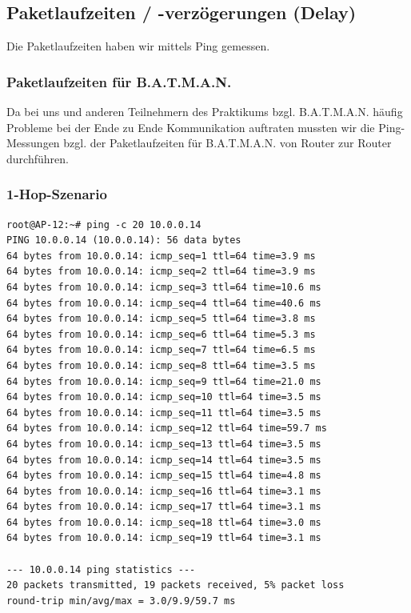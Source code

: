 \documentclass[a4paper,10pt]{article}
\begin{document}
\subsection{Paketlaufzeiten / -verzögerungen (Delay)}


Die Paketlaufzeiten haben wir mittels Ping gemessen.

\subsubsection{Paketlaufzeiten für B.A.T.M.A.N.}

Da bei uns und anderen Teilnehmern des Praktikums bzgl. B.A.T.M.A.N. häufig Probleme bei der Ende zu Ende Kommunikation auftraten mussten wir die Ping-Messungen bzgl. der Paketlaufzeiten für B.A.T.M.A.N. von Router zur Router durchführen.

\subsubsection*{1-Hop-Szenario}

\begin{lstlisting}
root@AP-12:~# ping -c 20 10.0.0.14
PING 10.0.0.14 (10.0.0.14): 56 data bytes
64 bytes from 10.0.0.14: icmp_seq=1 ttl=64 time=3.9 ms
64 bytes from 10.0.0.14: icmp_seq=2 ttl=64 time=3.9 ms
64 bytes from 10.0.0.14: icmp_seq=3 ttl=64 time=10.6 ms
64 bytes from 10.0.0.14: icmp_seq=4 ttl=64 time=40.6 ms
64 bytes from 10.0.0.14: icmp_seq=5 ttl=64 time=3.8 ms
64 bytes from 10.0.0.14: icmp_seq=6 ttl=64 time=5.3 ms
64 bytes from 10.0.0.14: icmp_seq=7 ttl=64 time=6.5 ms
64 bytes from 10.0.0.14: icmp_seq=8 ttl=64 time=3.5 ms
64 bytes from 10.0.0.14: icmp_seq=9 ttl=64 time=21.0 ms
64 bytes from 10.0.0.14: icmp_seq=10 ttl=64 time=3.5 ms
64 bytes from 10.0.0.14: icmp_seq=11 ttl=64 time=3.5 ms
64 bytes from 10.0.0.14: icmp_seq=12 ttl=64 time=59.7 ms
64 bytes from 10.0.0.14: icmp_seq=13 ttl=64 time=3.5 ms
64 bytes from 10.0.0.14: icmp_seq=14 ttl=64 time=3.5 ms
64 bytes from 10.0.0.14: icmp_seq=15 ttl=64 time=4.8 ms
64 bytes from 10.0.0.14: icmp_seq=16 ttl=64 time=3.1 ms
64 bytes from 10.0.0.14: icmp_seq=17 ttl=64 time=3.1 ms
64 bytes from 10.0.0.14: icmp_seq=18 ttl=64 time=3.0 ms
64 bytes from 10.0.0.14: icmp_seq=19 ttl=64 time=3.1 ms

--- 10.0.0.14 ping statistics --- 
20 packets transmitted, 19 packets received, 5% packet loss
round-trip min/avg/max = 3.0/9.9/59.7 ms
\end{lstlisting}
\end{document}
